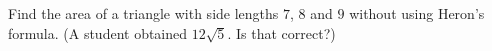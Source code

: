 Find the area of a triangle with side lengths $7$, $8$ and $9$ without using Heron's formula. (A student obtained $12\sqrt5$. Is that correct?)
